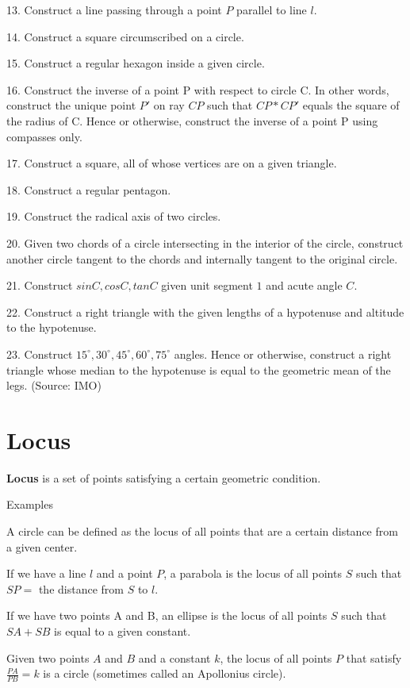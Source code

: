 13. Construct a line passing through a point $P$ parallel to line $l$.

14. Construct a square circumscribed on a circle.

15. Construct a regular hexagon inside a given circle.

16. Construct the inverse of a point P with respect to circle C. In other words, construct the unique point $P'$ on ray $CP$ such that $CP * CP'$ equals the square of the radius of C. Hence or otherwise, construct the inverse of a point P using compasses only.

17. Construct a square, all of whose vertices are on a given triangle.

18. Construct a regular pentagon.

19. Construct the radical axis of two circles.

20. Given two chords of a circle intersecting in the interior of the circle, construct another circle tangent to the chords and internally tangent to the original circle.

21. Construct $sin C, cos C, tan C$ given unit segment $1$ and acute angle $C$.

22. Construct a right triangle with the given lengths of a hypotenuse and altitude to the hypotenuse.

23. Construct $15^\circ, 30^\circ, 45^\circ, 60^\circ, 75^\circ$ angles. Hence or otherwise, construct a right triangle whose median to the hypotenuse is equal to the geometric mean of the legs. (Source: IMO)

\section{Locus}
\textbf{Locus} is a set of points satisfying a certain geometric condition.

Examples

A circle can be defined as the locus of all points that are a certain distance from a given center.

If we have a line $l$ and a point $P$, a parabola is the locus of all points $S$ such that $SP=$ the distance from $S$ to $l$.

If we have two points A and B, an ellipse is the locus of all points $S$ such that $SA+SB$ is equal to a given constant.

Given two points $A$ and $B$ and a constant $k$, the locus of all points $P$ that satisfy $\frac{PA}{PB} = k$ is a circle (sometimes called an Apollonius circle).

